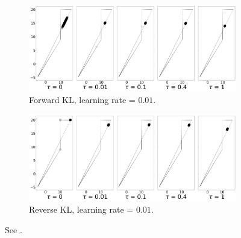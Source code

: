 \documentclass[\main/thesis.tex]{subfiles}
\begin{document}

\begin{figure}[!htb]
    \centering
    \begin{subfigure}{0.7\linewidth}
    \centering
    \includegraphics[width=\columnwidth]{figs/continuous-switch-stay/notlearnQ/polytope_forward_optim=rmsprop_lr=0.01.png}
    \caption{Forward KL, learning rate = $0.01$.}
    \label{fig:cont-switch-stay-forward-0.01}
  \end{subfigure}\hspace{15pt}
  
  \begin{subfigure}[b]{0.7\linewidth}
        \centering
        \includegraphics[width=\columnwidth]{figs/continuous-switch-stay/notlearnQ/polytope_reverse_optim=rmsprop_lr=0.01.png}
        \caption{Reverse KL, learning rate = $0.01$.}
        \label{fig:cont-switch-stay-reverse-0.01}
  \end{subfigure}
  \caption{See .}
  \label{fig:cont-ss-poly-0.01}
\end{figure}
\end{document}
